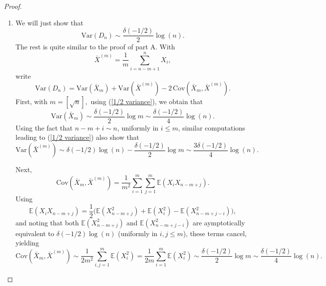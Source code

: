 \documentclass[12pt]{article}
\numberwithin{equation}{section}
\begin{document}
\begin{proof}
\begin{enumerate}
\begin{eqnarray*}
{\left(\left\vert\sum_{j=s}^n\left(\frac{j}{n}-1\right)a_{j-s}\right\vert\right)}\\
&&=O\left(\sum_{s=1}^n\left[\frac{(n-s)^{1/2}}{n}+\left(1-\frac{s}{n}\right)(n-s)^{-1/2}\right]^2\right)
\end{eqnarray*}
and the sum inside the parentheses converges to 
$$
\int_0^14xdx=2.
$$
Summing over $s$ between $\min(k,k')$ and $\max(k,k')$ gives the following (taking $k<k'$)
\begin{eqnarray*}\lefteqn{
\frac{1}{n^2}\sum_{k'=1}^n\sum_{k=1}^{k'}\sum_{s=k}^{k'}
\left(\left\vert\sum_{j=s}^n\left(\frac{j}{n}-1\right)a_{j-s}\right\vert\right)\left(\left\vert\sum_{j=s}^{k'}\frac{j}{n}a_{j-s}\right\vert+\left\vert\sum_{j=k'+1}^n\left(\frac{j}{n}-1\right)a_{j-s}\right\vert\right)}\\
&&=O\left(\frac{1}{n}\sum_{k'=1}^n\sum_{s=1}^{k'}n^{-1/2}\left(\frac{k'-s}{n}\right)^{-1/2}n^{-1/2}\right).
\end{eqnarray*}
The sum converges to 
$$
\int_0^1\int_0^x(x-y)^{-1/2}dydx=\frac{4}{3}.
$$
This completes the proof of (\ref{third term}), which in turn completes the proof of (\ref{lim var}).
\item We will just show that 
\begin{equation}\label{dif var}
\textrm{Var}(D_n)\sim\frac{\delta(-1/2)}{2}\log(n).
\end{equation}
The rest is quite similar to the proof of part A. With
$$
\bar X^{(m)}=\frac{1}{m}\sum_{i=n-m+1}^nX_i,
$$
write
\[
\mathrm{Var}(D_n)
=\mathrm{Var}(\bar X_m)+\mathrm{Var}(\bar X^{(m)})
-2\,\mathrm{Cov}(\bar X_m,\bar X^{(m)}).
\]
First, with $m=[\sqrt{n}],$ using (\ref{1/2 variance}), we obtain that
$$
\mathrm{Var}(\bar X_m)\sim\frac{\delta(-1/2)}{2}\log m\sim\frac{\delta(-1/2)}{4}\log(n).
$$
Using the fact that $n-m+i\sim n$, uniformly in $i\le m$, similar computations leading to (\ref{1/2 variance}) also show that
$$
\mathrm{Var}(\bar X^{(m)})\sim
\delta(-1/2)\log(n)-\frac{\delta(-1/2)}{2}\log m\sim
\frac{3\delta(-1/2)}{4}\log(n).
$$

Next,
\[
\mathrm{Cov}(\bar X_m,\bar X^{(m)})
=\frac{1}{m^2}\sum_{i=1}^m\sum_{j=1}^m \mathbb{E}(X_iX_{n-m+j}).
\]
Using
\[
\mathbb{E}(X_iX_{n-m+j})
=\frac12\Big(
\mathbb{E}(X_{n-m+j}^2)+\mathbb{E}(X_i^2)-\mathbb{E}(X_{n-m+j-i}^2)
\Big),
\]
and noting that both $\mathbb{E}(X_{n-m+j}^2)$ and $\mathbb{E}(X_{n-m+j-i}^2)$ are aymptotically equivalent  to $\delta(-1/2)\log(n)$ (uniformly in $i,j\le m$), these terms cancel, yielding
\[
\mathrm{Cov}(\bar X_m,\bar X^{(m)})
\sim \frac{1}{2m^2}\sum_{i,j=1}^m \mathbb{E}(X_i^2)
=\frac{1}{2m}\sum_{i=1}^m \mathbb{E}(X_i^2)
\sim \frac{\delta(-1/2)}{2}\log m
\sim \frac{\delta(-1/2)}{4}\log(n).
\]


\end{enumerate}
\end{proof}
\end{document}

